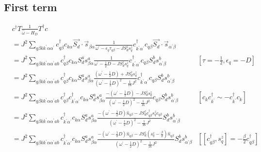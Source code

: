 \documentclass[12pt]{article}
\begin{document}
\subsection{First term}
\begin{equation}\begin{aligned}
	&c^\dagger T \frac{1}{\hat \omega - H_D}T^\dagger c \\
	&= J^2\sum_{q\beta k k^\prime \alpha \alpha^\prime} c^\dagger_{q\beta} c_{k\alpha} \vec{S_d}\cdot\vec{s}_{\beta \alpha} \frac{1}{\omega^\prime - \epsilon_q\tau_{q\beta} - J S_d^z s_q^z}c^\dagger_{k^\prime\alpha^\prime} c_{q\beta} \vec{S_d}\cdot\vec{s}_{\alpha^\prime \beta}\\
	&= J^2\sum_{q\beta k k^\prime \alpha \alpha^\prime a b} c^\dagger_{q\beta} c_{k\alpha} S_d^a s^a_{\beta \alpha} \frac{1}{\omega^\prime - \frac{1}{2}D - J S_d^z s_q^z}c^\dagger_{k^\prime\alpha^\prime} c_{q\beta} S_d^b s^b_{\alpha^\prime \beta} & \left[\tau = -\frac{1}{2},\epsilon_q = -D\right] \\
							   &= J^2\sum_{q\beta k k^\prime \alpha \alpha^\prime a b} c^\dagger_{q\beta} c_{k\alpha} S_d^a s^a_{\beta \alpha} \frac{\left(\omega^\prime - \frac{1}{2}D\right) + J S_d^z s_q^z}{\left(\omega^\prime - \frac{1}{2}D\right)^2 - \frac{1}{16}J^2}c^\dagger_{k^\prime\alpha^\prime} c_{q\beta} S_d^b s^b_{\alpha^\prime \beta}\\
							   &= J^2\sum_{q\beta k k^\prime \alpha \alpha^\prime a b} c^\dagger_{q\beta} c^\dagger_{k^\prime\alpha^\prime}c_{k\alpha} S_d^a s^a_{\beta \alpha} \frac{-\left(\omega^\prime - \frac{1}{2}D\right) - J S_d^z s_q^z}{\left(\omega^\prime - \frac{1}{2}D\right)^2 - \frac{1}{16}J^2} c_{q\beta} S_d^b s^b_{\alpha^\prime \beta} & \left[c_k c^\dagger_{k^\prime} \sim - c^\dagger_{k^\prime}c_k\right] \\
							   &= J^2\sum_{q\beta k k^\prime \alpha \alpha^\prime a b} c^\dagger_{k^\prime\alpha^\prime}c_{k\alpha} S_d^a s^a_{\beta \alpha} \frac{-\left(\omega^\prime - \frac{1}{2}D\right) \hat n_{q\beta} - J S_d^z  c^\dagger_{q\beta}s_q^z c_{q\beta}}{\left(\omega^\prime - \frac{1}{2}D\right)^2 - \frac{1}{16}J^2} S_d^b s^b_{\alpha^\prime \beta} \\
							   &= J^2\sum_{q\beta k k^\prime \alpha \alpha^\prime a b} c^\dagger_{k^\prime\alpha^\prime}c_{k\alpha} S_d^a s^a_{\beta \alpha} \frac{-\left(\omega^\prime - \frac{1}{2}D\right) \hat n_{q\beta} - J S_d^z \left(s_q^z - \frac{\beta}{2}\right) \hat n_{q\beta}}{\left(\omega^\prime - \frac{1}{2}D\right)^2 - \frac{1}{16}J^2} S_d^b s^b_{\alpha^\prime \beta} & \left[\left[c^\dagger_{q\beta}, s_q^z\right] = -\frac{\beta}{2} c^\dagger_{q\beta}\right] \\

\end{aligned}
\end{equation}
\end{document}
